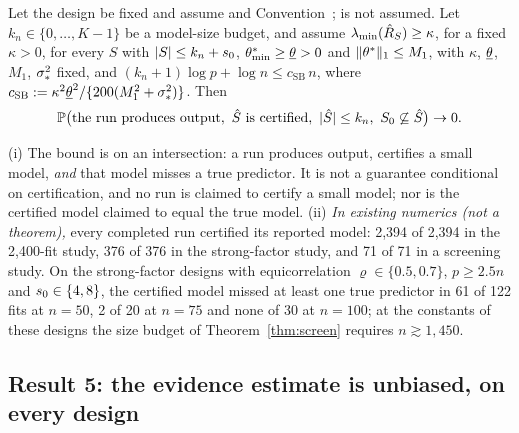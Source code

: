 \begin{theorem}\label{thm:screen}
Let the design be fixed and assume  and Convention~;  is not assumed. Let $k_n\in\{0,\dots,K-1\}$ be
a model-size budget, and assume $\lambda_{\min}(\hat R_S)\ge\kappa$, for a fixed $\kappa>0$, for every $S$ with $\lvert S\rvert\le k_n+s_0$, $\theta^*_{\min}\ge\underline\theta>0$ and
$\lVert \theta^*\rVert_1\le M_1$, with $\kappa$, $\underline\theta$, $M_1$, $\sigma_*^2$ fixed, and $(k_n+1)\log p+\log n\le c_{\mathrm{SB}}\,n$, where
$c_{\mathrm{SB}}:=\kappa^2\underline\theta^2/\{200(M_1^2+\sigma_*^2)\}$. Then
\[
  \P\big(\text{the run produces output},\ \Shat\text{ is certified},\ \abs{\Shat}\le k_n,\ \Sz\not\subseteq\Shat\big)\to0 .
\]
\end{theorem}




\begin{remark}\label{rem:screen}
(i) The bound is on an intersection: a run produces output, certifies a small model, \emph{and} that model misses a true
predictor. It is not a guarantee conditional on certification, and no run is claimed to certify a small model; nor is the
certified model claimed to equal the true model.
(ii) \emph{In existing numerics (not a theorem),} every completed run certified its reported model: 2,394 of 2,394 in the
2,400-fit study, 376 of 376 in the strong-factor study, and 71 of 71 in a screening study. On the strong-factor designs with
equicorrelation $\varrho\in\{0.5,0.7\}$, $p\ge2.5n$ and $s_0\in\{4,8\}$, the certified model missed at least one true
predictor in 61 of 122 fits at $n=50$, 2 of 20 at $n=75$ and none of 30 at $n=100$; at the constants of these designs the
size budget of Theorem~\ref{thm:screen} requires $n\gtrsim1{,}450$.
\end{remark}

\subsection{Result 5: the evidence estimate is unbiased, on every design}\label{sec:estimates}\label{sec:unbiased}


